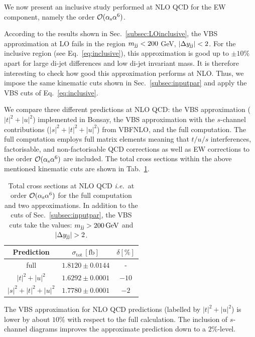 We now present an inclusive study performed at NLO QCD for the EW component, namely the order $\mathcal{O}(\alpha_\text{s}\alpha^6)$.

According to the results shown in Sec.~\ref{subsec:LOinclusive}, the VBS approximation at LO fails in the region $m_{\text{j}\text{j}} < 200$ GeV, $|\Delta y_{\text{j}\text{j}}| < 2$.
For the inclusive region (see Eq.~\eqref{eq:inclusive}), this approximation is good up to $\pm10\%$ apart for large di-jet differences and low di-jet invariant mass.
It is therefore interesting to check how good this approximation performs at NLO.
Thus, we impose the same kinematic cuts shown in Sec.~\ref{subsec:inputpar} and apply the VBS cuts of Eq.~\eqref{eq:inclusive}.

We compare three different predictions at NLO QCD: 
the VBS approximation ($|t|^2+|u|^2$) implemented in {\sc Bonsay}, the VBS approximation with the $s$-channel contributions ($|s|^2+|t|^2+|u|^2$) from {\sc VBFNLO}, and the full computation.
The full computation employs full matrix elements meaning that $t/u/s$ interferences, factorisable, and non-factorisable QCD corrections as well as EW corrections to the order $\mathcal{O}(\alpha_\text{s} \alpha^6)$ are included.
The total cross sections within the above mentioned kinematic cuts are shown in Tab.~\ref{tab:crosssecINCLUSIVE}.

\begin{table}[h!]
\centering
\begin{tabular}{c|c|c}
Prediction & $\sigma_{\textrm{tot}}\,[\textrm{fb}]$ & $\delta [\%]$ \\
\hline
\hline
full &  $1.8120 \pm 0.0144$ & - \\
\hline
$|t|^2 + |u|^2$ & $1.6292 \pm 0.0001$  &  $-10$ \\
\hline
$|s|^2 + |t|^2 + |u|^2$ & $1.7780 \pm 0.0001$  & $-2$
\end{tabular}
\caption{
Total cross sections at NLO QCD \emph{i.e.}\ at order $\mathcal{O}(\alpha_\text{s}\alpha^6)$ for the full computation and two approximations.
In addition to the cuts of Sec.~\ref{subsec:inputpar}, the VBS cuts take the values: $m_{\text{j}\text{j}}>200 \,\text{GeV}$ and $|\Delta y_{\Pj\Pj}|>2$.}
\label{tab:crosssecINCLUSIVE}
\end{table}

The VBS approximation for NLO QCD predictions (labelled by $|t|^2 + |u|^2$) is lower by about $10\%$ with respect to the full calculation.
The inclusion of $s$-channel diagrams improves the approximate prediction down to a $2\%$-level.

